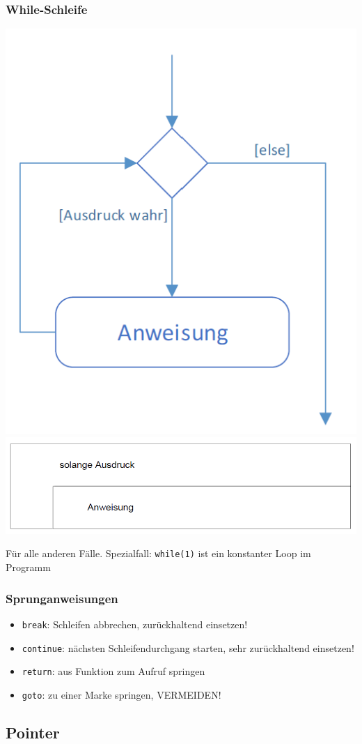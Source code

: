 		\subsubsection{While-Schleife}
			\begin{minipage}{.45\linewidth}
				\includegraphics[width=0.5\linewidth]{Bilder/while1.png}
				\includegraphics[width=0.5\linewidth]{Bilder/while2.png}
			\end{minipage}
			\hfill
			\begin{minipage}{.5\linewidth}
				Für alle anderen Fälle. Spezialfall: \verb|while(1)| ist ein konstanter Loop im Programm
			\end{minipage}

		\subsubsection{Sprunganweisungen}
			\begin{itemize}
				\item \verb|break|: Schleifen abbrechen, zurückhaltend einsetzen!
				\item \verb|continue|: nächsten Schleifendurchgang starten, sehr zurückhaltend einsetzen!
				\item \verb|return|: aus Funktion zum Aufruf springen
				\item \verb|goto|: zu einer Marke springen, VERMEIDEN!
			\end{itemize}

	\subsection{Pointer}
